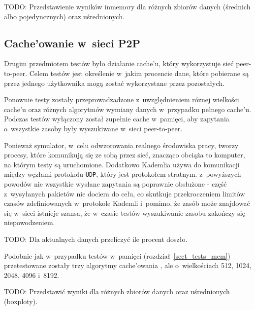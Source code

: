 \documentclass[a4paper,11pt]{scrartcl}
\newcommand{\f}{\texttt}
\newcommand{\s}{ }
\newcommand{\kesz}{cache}
\newcommand{\keszu}{cache'u}
\newcommand{\keszowania}{cache'owania}
\newcommand{\Keszowanie}{Cache'owanie}
\begin{document}
TODO: Przedstawienie wyników inmemory dla różnych zbiorów danych (średnich albo pojedyncznych) oraz uśrednionych.


\subsection{\Keszowanie\s w~sieci P2P}
Drugim przedmiotem testów było działanie \keszu, który wykorzystuje sieć peer-to-peer. Celem testów jest określenie w~jakim procencie dane, które pobierane są przez jednego użytkownika mogą zostać wykorzystane przez pozostałych.

Ponownie testy zostały przeprowadzadzone z~uwzględnieniem róznej wielkości \keszu\s oraz różnych algorytmów wymiany danych w~przypadku pełnego \keszu. Podczas testów wyłączony został zupełnie \kesz\s w~pamięci, aby zapytania o~wszystkie zasoby były wyszukiwane w~sieci peer-to-peer.

Ponieważ symulator, w~celu odwzorowania realnego środowiska pracy, tworzy procesy, które komunikują się ze sobą przez sieć, znacząco obciąża to komputer, na którym testy są uruchomione. Dodatkowo Kademlia używa do komunikacji między węzłami protokołu \f{UDP}, który jest protokołem stratnym. z~powyższych powodów nie wszystkie wysłane zapytania są poprawnie obsłużone - część z~wysyłanych pakietów nie dociera do celu, co skutkuje przekroczeniem limitów czasów zdefiniowanych w~protokole Kademli i~pomimo, że zasób może znajdować się w~sieci istnieje szansa, że w~czasie testów wyszukiwanie zasobu zakończy się niepowodzeniem.

TODO: Dla aktualnych danych przeliczyć ile procent doszło.

Podobnie jak w~przypadku testów w~pamięci (rozdział~\ref{sect_tests_mem}) przetestowane zostały trzy algorytmy \keszowania\s, ale o~wielkościach 512, 1024, 2048, 4096 i~8192.

TODO: Przedstawić wyniki dla różnych zbiorów danych oraz uśrednionych (boxploty).
\end{document}
